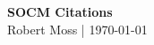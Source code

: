 \documentclass[11pt]{article}
\begin{document}
\begin{center}
	\textbf{\LARGE SOCM Citations}
	\\
	Robert Moss | \today
\end{center}



\nocite{*}


\end{document}
